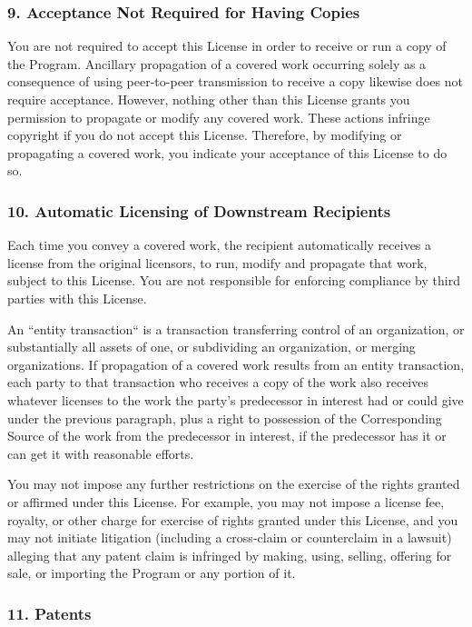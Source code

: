 \documentclass[a4paper, 11pt, twoside]{article}
\begin{document}
\subsubsection{9. Acceptance Not Required for Having Copies}

You are not required to accept this License in order to receive or run a copy of the Program. Ancillary propagation of a covered work occurring solely as a consequence of using peer-to-peer transmission to receive a copy likewise does not require acceptance. However, nothing other than this License grants you permission to propagate or modify any covered work. These actions infringe copyright if you do not accept this License. Therefore, by modifying or propagating a covered work, you indicate your acceptance of this License to do so.

\subsubsection{10. Automatic Licensing of Downstream Recipients}

Each time you convey a covered work, the recipient automatically receives a license from the original licensors, to run, modify and propagate that work, subject to this License. You are not responsible for enforcing compliance by third parties with this License.

An “entity transaction“ is a transaction transferring control of an organization, or substantially all assets of one, or subdividing an organization, or merging organizations. If propagation of a covered work results from an entity transaction, each party to that transaction who receives a copy of the work also receives whatever licenses to the work the party's predecessor in interest had or could give under the previous paragraph, plus a right to possession of the Corresponding Source of the work from the predecessor in interest, if the predecessor has it or can get it with reasonable efforts.

You may not impose any further restrictions on the exercise of the rights granted or affirmed under this License. For example, you may not impose a license fee, royalty, or other charge for exercise of rights granted under this License, and you may not initiate litigation (including a cross-claim or counterclaim in a lawsuit) alleging that any patent claim is infringed by making, using, selling, offering for sale, or importing the Program or any portion of it.

\subsubsection{11. Patents}
\end{document}
